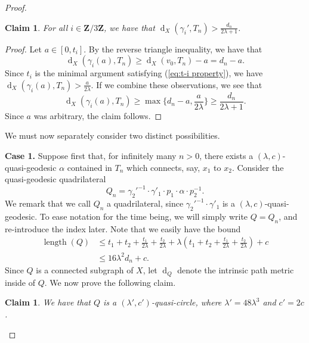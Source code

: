 \documentclass[11pt,a4paper]{amsart}
\DeclareMathOperator{\length}{length}
\DeclareMathOperator{\dist}{d}
\newcommand{\Z}{\mathbf{Z}}
\newtheorem{claim}[theorem]{Claim}
\theoremstyle{definition}
\begin{document}
\begin{proof}
    \begin{claim}\label{claim:bound-on-dist-from-gamma-to-Tn}
        For all $i \in \Z/3\Z$, we have that 
        $\dist_X(\gamma_i', T_n) > \frac{d_n}{2\lambda+1}$.
    \end{claim}

    \begin{proof}
        Let $a \in [0,t_i]$. By the reverse triangle inequality, we have that 
        $$
        \dist_X(\gamma_i(a), T_n) \geq \dist_X(v_0,T_n) - a = d_n - a.
        $$
        Since $t_i$ is the minimal argument satisfying (\ref{eq:t-i property}), we have 
        $
        \dist_X(\gamma_i(a), T_n) > \frac{a}{2\lambda} 
        $. 
        If we combine these observations, we see that $$
        \dist_X(\gamma_i(a), T_n) \geq \max\{d_n-a, \frac a {2\lambda}\} \geq \frac {d_n}{2\lambda + 1}.
        $$
        Since $a$ was arbitrary, the claim follows. 
    \end{proof}
    
    We must now separately consider two distinct possibilities. 

    \medskip

    \textbf{Case 1.} Suppose first that, for infinitely many $n > 0$, there exists a $(\lambda,c)$-quasi-geodesic $\alpha$ contained in $T_n$ which connects, say, $x_1$ to $x_2$. Consider the quasi-geodesic quadrilateral 
    $$
    Q_n = \gamma_2'^{-1} \cdot \gamma'_1 \cdot p_1 \cdot \alpha \cdot p_2^{-1}.
    $$
    We remark that we call $Q_n$ a quadrilateral, since $\gamma_2'^{-1} \cdot \gamma'_1$ is a $(\lambda, c)$-quasi-geodesic. 
    To ease notation for the time being, we will simply write $Q = Q_n$, and re-introduce the index later. 
    Note that we easily have the bound
    \begin{align*}
        \length(Q) &\leq t_1 + t_2 + \frac{t_1}{2\lambda} + \frac{t_2}{2\lambda} + \lambda \left( t_1 + t_2 + \frac{t_1}{2\lambda} + \frac{t_2}{2\lambda}\right) + c \\
        &\leq 16\lambda^2d_n + c.
    \end{align*}
    Since $Q$ is a connected subgraph of $X$, let $\dist_Q$ denote the intrinsic path metric inside of $Q$. 
    We now prove the following claim.

    \begin{claim}\label{claim:quasi-circle}
        We have that $Q$ is a $(\lambda', c')$-quasi-circle, where $\lambda' = 48\lambda^3$ and $c' = 2c$. 
    \end{claim}


\end{proof}
\end{document}
